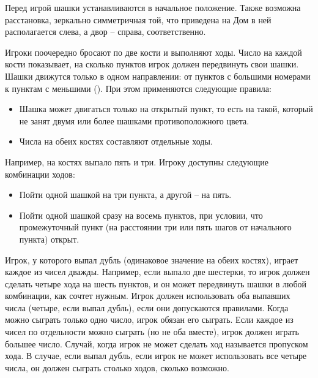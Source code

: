 Перед игрой шашки устанавливаются в начальное положение. Также возможна расстановка, зеркально симметричная той, что приведена на  Дом в ней располагается слева, а двор -- справа, соответственно.


Игроки поочередно бросают по две кости и выполняют ходы. Число на каждой кости показывает, на сколько пунктов игрок должен передвинуть свои шашки. Шашки движутся только в одном направлении: от пунктов с большими номерами к пунктам с меньшими (). При этом применяются следующие правила:
\begin{itemize}
    \item Шашка может двигаться только на открытый пункт, то есть на такой, который не занят двумя или более шашками противоположного цвета.
    \item Числа на обеих костях составляют отдельные ходы.
\end{itemize}


Например, на костях выпало пять и три. Игроку доступны следующие комбинации ходов:
\begin{itemize}
    \item Пойти одной шашкой на три пункта, а другой -- на пять.
    \item Пойти одной шашкой сразу на восемь пунктов, при условии, что промежуточный пункт (на расстоянии три или пять шагов от начального пункта) открыт.
\end{itemize}

Игрок, у которого выпал дубль (одинаковое значение на обеих костях), играет каждое из чисел дважды. Например, если выпало две шестерки, то игрок должен сделать четыре хода на шесть пунктов, и он может передвинуть шашки в любой комбинации, как сочтет нужным. Игрок должен использовать оба выпавших числа (четыре, если выпал дубль), если они допускаются правилами. Когда можно сыграть только одно число, игрок обязан его сыграть. Если каждое из чисел по отдельности можно сыграть (но не оба вместе), игрок должен играть большее число. Случай, когда игрок не может сделать ход называется пропуском хода. В случае, если выпал дубль, если игрок не может использовать все четыре числа, он должен сыграть столько ходов, сколько возможно.

